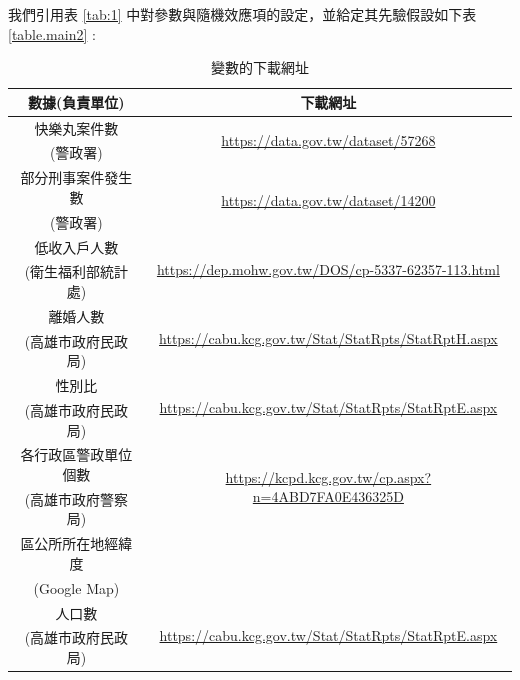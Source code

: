 \documentclass[12pt,a4paper]{article}
\newcommand{\smallurl}[1]{\urlstyle{same}\footnotesize\fontsize{20pt}{14pt}\url{#1}}
\begin{document}
\begin{CJK}{UTF8}{bkai}
我們引用表 \ref{tab:1} 中對參數與隨機效應項的設定，並給定其先驗假設如下表 \ref{table.main2} :
\begin{table}[H]
\centering
\setlength{\belowcaptionskip}{0.5cm}
\caption{變數的下載網址}
\begin{tabular}{cp{5cm}}
\hline
\multicolumn{1}{c}{數據(負責單位)} & \multicolumn{1}{c}{下載網址}\\
\hline
\multicolumn{1}{c}{快樂丸案件數} & \multicolumn{1}{c}{\multirow{2}{*}{\smallurl{https://data.gov.tw/dataset/57268}}}\\
\multicolumn{1}{c}{(警政署)} & \\
\hline
\multicolumn{1}{c}{部分刑事案件發生數} & \multicolumn{1}{c}{\multirow{2}{*}{\smallurl{https://data.gov.tw/dataset/14200}}}\\
\multicolumn{1}{c}{(警政署)}&\\
\hline
\multicolumn{1}{c}{低收入戶人數} & \multicolumn{1}{c}{\multirow{2}{*}{\smallurl{https://dep.mohw.gov.tw/DOS/cp-5337-62357-113.html}}}\\
\multicolumn{1}{c}{(衛生福利部統計處)}&\\
\hline
\multicolumn{1}{c}{離婚人數} & \multicolumn{1}{c}{\multirow{2}{*}{\smallurl{https://cabu.kcg.gov.tw/Stat/StatRpts/StatRptH.aspx}}}\\
\multicolumn{1}{c}{(高雄市政府民政局)}&\\
\hline
\multicolumn{1}{c}{性別比} & \multicolumn{1}{c}{\multirow{2}{*}{\smallurl{https://cabu.kcg.gov.tw/Stat/StatRpts/StatRptE.aspx}}}\\
\multicolumn{1}{c}{(高雄市政府民政局)}&\\
\hline
\multicolumn{1}{c}{各行政區警政單位個數} & \multicolumn{1}{c}{\multirow{2}{*}{\smallurl{https://kcpd.kcg.gov.tw/cp.aspx?n=4ABD7FA0E436325D}}}\\
\multicolumn{1}{c}{(高雄市政府警察局)}&\\
\hline
\multicolumn{1}{c}{區公所所在地經緯度} & \\
\multicolumn{1}{c}{(Google Map)} & \\
\hline
\multicolumn{1}{c}{人口數} & \multicolumn{1}{c}{\multirow{2}{*}{\smallurl{https://cabu.kcg.gov.tw/Stat/StatRpts/StatRptE.aspx}}}\\
\multicolumn{1}{c}{(高雄市政府民政局)} &\\
\hline
\end{tabular}
\label{table.main1}
\end{table}
\noindent


\end{CJK}
\end{document}
